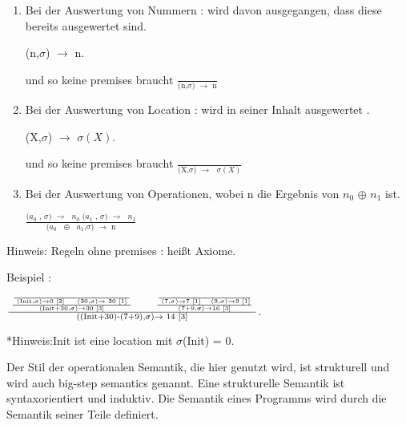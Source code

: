 \documentclass[a4paper,12pt,twoside,headsepline]{scrartcl}
\begin{document}
\begin{enumerate}

\item Bei der Auswertung von Nummern : wird davon ausgegangen, dass diese bereits ausgewertet sind.\label{1}
\begin{center}
(n,$\sigma$) $\to$ n.    

 und so keine premises braucht   $\frac{ } {\text{(n,$\sigma$) $\to$ n}}$
\end{center}  
\item Bei der Auswertung von Location : wird in seiner Inhalt ausgewertet .\label{2}

\begin{center}
	(X,$\sigma$) $\to$ $\sigma(X)$.    
	
	und so keine premises braucht    $\frac{ } {\text{(X,$\sigma$) $\to$ $\sigma(X)$}}$
\end{center} 

\item \label{3} Bei der Auswertung von Operationen, wobei n die Ergebnis von $n_0$ $\oplus$ $n_1$ ist.

\begin{center}
	 $\frac  {\text {($a_0$ , $\sigma$) $\to$ $n_0$   ($a_1$ , $\sigma$) $\to$ $n_1$} } { \text{($a_0$ $\oplus$ $a_1$,$\sigma$) $\to$ n} }$ 
\end{center}


\end{enumerate}   
Hinweis: Regeln ohne premises : heißt Axiome. 



Beispiel : 
\begin{center} \fontsize{18}{15}
	
	$\frac{  \text{  $\frac { \text {$\frac  {}  {\text{ (Init,$\sigma$)$\to$0 $\ref{2}$ $\quad$          (30,$\sigma$)$\to$ 30 $\ref{1}$ }}$}   } {\text{(Init+30,$\sigma$)$\to$30  $\ref{3}$}}$ $\qquad$   $\frac { \text {$\frac  {}  {\text{ (7,$\sigma$)$\to$7 $ $\ref{1}$\quad$           (9,$\sigma$)$\to$9 $\ref{1}$}}$}} {\text{(7+9,$\sigma$)$\to$16 $\ref{3}$}}$  }} {\text{((Init+30)-(7+9),$\sigma$)$\to$ 14 $\ref{3}$}}$.
	
	
	
	*Hinweis:Init ist eine location mit $\sigma$(Init) = 0. 
\end{center}

Der Stil der operationalen Semantik, die hier genutzt wird, ist strukturell und wird auch big-step semantics genannt.
Eine strukturelle Semantik ist syntaxorientiert und induktiv.
Die Semantik eines Programms wird durch die Semantik seiner Teile definiert.
\end{document}
